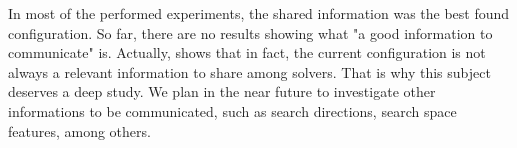 In most of the performed experiments, the shared information was the best found configuration. So far, there are no results showing what "a good information to communicate" is. Actually, \cite{Caniou14} shows that in fact, the current configuration is not always a relevant information to share among solvers. That is why this subject deserves a deep study. We plan in the near future to investigate other informations to be communicated, such as search directions, search space features, among others.